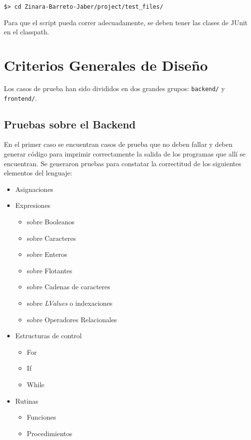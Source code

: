 \documentclass[12pt, spanish]{report}
\begin{document}
\begin{verbatim}
$> cd Zinara-Barreto-Jaber/project/test_files/
\end{verbatim}

Para que el script pueda correr adecuadamente, se deben tener las clases
de JUnit en el classpath.

\section{Criterios Generales de Diseño}
\label{sec:pruebas:diseño}

Los casos de prueba han sido divididos en dos grandes grupos:
\texttt{backend/} y \texttt{frontend/}.\\

\subsection{Pruebas sobre el Backend}
\label{sec:pruebas:backend}

En el primer caso se encuentran casos de prueba que no deben fallar y
deben generar código para imprimir correctamente la salida de los
programas que allí se encuentran. Se generaron pruebas para constatar
la correctitud de los siguientes elementos del lenguaje:

\begin{itemize}
\item Asignaciones
\item Expresiones
  \begin{itemize}
  \item sobre Booleanos
  \item sobre Caracteres
  \item sobre Enteros
  \item sobre Flotantes
  \item sobre Cadenas de caracteres
  \item sobre \emph{LValues} o indexaciones
  \item sobre Operadores Relacionales
  \end{itemize}
\item Estructuras de control
  \begin{itemize}
  \item For
  \item If
  \item While
  \end{itemize}
\item Rutinas
  \begin{itemize}
  \item Funciones
  \item Procedimientos
  \end{itemize}
\end{itemize}
\end{document}
